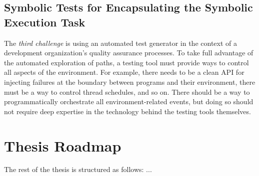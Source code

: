 \subsection{Symbolic Tests for Encapsulating the Symbolic Execution Task}

The {\em third challenge} is using an automated test generator in the context of a development organization's quality assurance processes.  To take full advantage of the automated exploration of paths, a testing tool must provide ways to control all aspects of the environment.  For example, there needs to be a clean API for injecting failures at the boundary between programs and their environment, there must be a way to control thread schedules, and so on.  There should be a way to programmatically orchestrate all environment-related events, but doing so should not require deep expertise in the technology behind the testing tools themselves.


\section{Thesis Roadmap}

The rest of the thesis is structured as follows: ...
\fi


